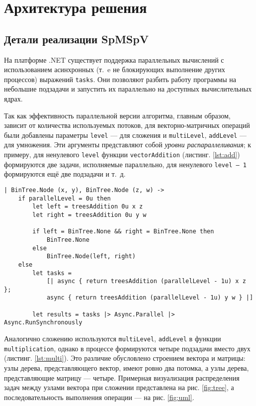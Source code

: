 
\section{Архитектура решения}

\subsection{Детали реализации SpMSpV}

На платформе .NET существует поддержка параллельных вычислений с использованием асинхронных (т.~e не блокирующих выполнение других процессов) выражений \texttt{tasks}. Они позволяют разбить работу программы на небольшие подзадачи и запустить их параллельно на доступных вычислительных ядрах.

Так как эффективность параллельной версии алгоритма, главным образом, зависит от количества используемых потоков, для векторно-матричных операций были добавлены параметры \texttt{level} --- для сложения и \texttt{multiLevel}, \texttt{addLevel} --- для умножения. Эти аргументы представляют собой \textit{уровни распараллеливания}; к примеру, для ненулевого \texttt{level} функции \texttt{vectorAddition} (листинг. \ref{lst:add}) формируются две задачи, исполняемые параллельно,  для ненулевого \texttt{level -- 1} формируются ещё две подзадачи и т.~д.

\begin{lstlisting}[style=fsharp, caption={Часть функции сложения векторов, отвечающая за параллельную составляющую векторной операции.}, label={lst:add},  frame=single, firstnumber=33]
| BinTree.Node (x, y), BinTree.Node (z, w) ->
    if parallelLevel = 0u then
        let left = treesAddition 0u x z
        let right = treesAddition 0u y w

        if left = BinTree.None && right = BinTree.None then
            BinTree.None
        else
            BinTree.Node(left, right)
    else
        let tasks =
            [| async { return treesAddition (parallelLevel - 1u) x z }; 
            async { return treesAddition (parallelLevel - 1u) y w } |]

        let results = tasks |> Async.Parallel |> Async.RunSynchronously
\end{lstlisting}

\newpage

Аналогично сложению используются \texttt{multiLevel}, \texttt{addLevel} в функции \texttt{multi\-plication}, однако в процессе формируются четыре подзадачи вместо двух (листинг. \ref{lst:multi}). Это различие обусловлено строением вектора и матрицы: узлы дерева, представляющего вектор, имеют ровно два потомка, а узлы дерева, представляющие матрицу --- четыре. Примерная визуализация распределения задач между узлами вектора при сложении представлена на рис. \ref{fig:tree}, а последовательность выполнения операции --- на рис. \ref{fig:uml}.


